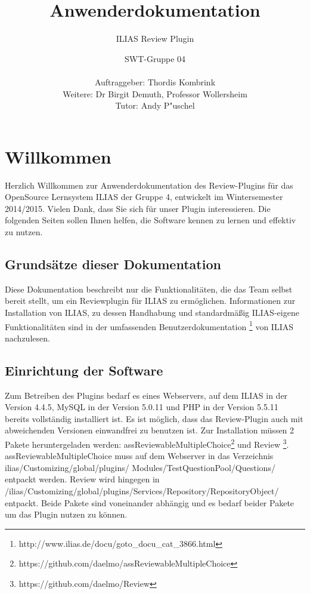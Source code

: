 \documentclass[12pt,a4paper]{scrreprt}
\begin{document}
\title{Anwenderdokumentation}
\subtitle{ILIAS Review Plugin}
\publishers{Version: 5.0, Status: Fertiggestellt}
\author{SWT-Gruppe 04\\ \\Auftraggeber: Thordis Kombrink\\Weitere: Dr Birgit Demuth, Professor Wollersheim\\Tutor: Andy P"uschel}
\maketitle
\tableofcontents

\chapter{Willkommen}
Herzlich Willkommen zur Anwenderdokumentation des Review-Plugins für das OpenSource Lernsystem ILIAS der Gruppe 4, entwickelt im Wintersemester 2014/2015. Vielen Dank, dass Sie sich für unser Plugin interessieren. Die folgenden Seiten sollen Ihnen helfen, die Software kennen zu lernen und effektiv zu nutzen. 

\section{Grundsätze dieser Dokumentation}
Diese Dokumentation beschreibt nur die Funktionalitäten, die das Team selbst bereit stellt, um ein Reviewplugin für ILIAS zu ermöglichen. Informationen zur Installation von ILIAS, zu dessen Handhabung und standardmäßig ILIAS-eigene Funktionalitäten sind in der umfassenden Benutzerdokumentation
\footnote{\label{foot:1}http://www.ilias.de/docu/goto\_docu\_cat\_3866.html} von ILIAS nachzulesen. 

\section{Einrichtung der Software}
Zum Betreiben des Plugins bedarf es eines Webservers, auf dem ILIAS in der Version 4.4.5, MySQL in der Version 5.0.11 und PHP in der Version 5.5.11 bereits vollständig installiert ist. Es ist möglich, dass das Review-Plugin auch mit abweichenden Versionen einwandfrei zu benutzen ist.
Zur Installation müssen 2 Pakete heruntergeladen werden: assReviewableMultipleChoice\footnote{\label{foot:2}https://github.com/daelmo/assReviewableMultipleChoice}	und Review
\footnote{\label{foot:3}https://github.com/daelmo/Review}. 
	assReviewableMultipleChoice muss auf dem Webserver in das Verzeichnis ilias/Customizing/global/plugins/ Modules/TestQuestionPool/Questions/ entpackt werden. Review wird hingegen in /ilias/Customizing/global/plugins/Services/Repository/RepositoryObject/ entpackt.
	Beide Pakete sind voneinander abhängig und es bedarf beider Pakete um das Plugin nutzen zu können.
	
\end{document}
